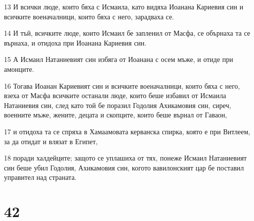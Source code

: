 \par 13 И всички люде, които бяха с Исмаила, като видяха Иоанана Кариевия син и всичките военачалници, които бяха с него, зарадваха се.
\par 14 И тъй, всичките люде, които Исмаил бе запленил от Масфа, се обърнаха та се върнаха, и отидоха при Иоанана Кариевия син.
\par 15 А Исмаил Натаниевият син избяга от Иоанана с осем мъже, и отиде при амонците.
\par 16 Тогава Иоанан Кариевият син и всичките военачалници, които бяха с него, взеха от Масфа всичките останали люде, които беше избавил от Исмаила Натаниевия син, след като той бе поразил Годолия Ахикамовия син, сиреч, военните мъже, жените, децата и скопците, които беше върнал от Гаваон,
\par 17 и отидоха та се спряха в Хамаамовата керванска спирка, която е при Витлеем, за да отидат и влязат в Египет,
\par 18 поради халдейците; защото се уплашиха от тях, понеже Исмаил Натаниевият син беше убил Годолия, Ахикамовия син, когото вавилонският цар бе поставил управител над страната.

\chapter{42}

